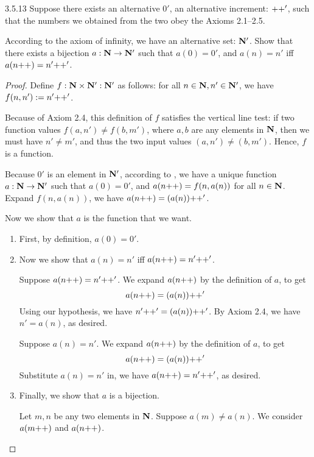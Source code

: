 \begin{exercise}{3.5.13}
	Suppose there exists an alternative $0'$, an alternative increment: ${+}{+}'$, such that the numbers we obtained from the two obey the Axioms 2.1--2.5.
	
	According to the axiom of infinity, we have an alternative set: $\mathbf{N}'$. Show that there exists a bijection $a: \mathbf{N} \to \mathbf{N}'$ such that $a(0) = 0'$, and $a(n) = n'$ iff $a(n{+}{+}) = n'{+}{+}'$.
\end{exercise}
\begin{proof}
Define $f: \mathbf{N} \times \mathbf{N}' : \mathbf{N}'$ as follows: for all $n \in \mathbf{N}, n' \in \mathbf{N}'$, we have $f(n,n') := n'{+}{+}'$.

Because of Axiom 2.4, this definition of $f$ satisfies the vertical line test: if two function values $f(a,n') \ne f(b,m')$, where $a,b$ are any elements in $\mathbf{N}$, then we must have $n' \ne m'$, and thus the two input values $(a,n') \ne (b,m')$. Hence, $f$ is a function.

Because $0'$ is an element in $\mathbf{N}'$, according to , we have a unique function $a: \mathbf{N} \to \mathbf{N}'$ such that $a(0) = 0'$, and $a(n{+}{+}) = f(n,a(n))$ for all $n \in \mathbf{N}$. Expand $f(n,a(n))$, we have $a(n{+}{+}) = (a(n)){+}{+}'$.

Now we show that $a$ is the function that we want. 
\begin{enumerate}
	\item First, by definition, $a(0) = 0'$. 
	
	\item Now we show that $a(n) = n'$ iff $a(n{+}{+}) = n'{+}{+}'$. 
	
	\myifbox Suppose $a(n{+}{+}) = n'{+}{+}'$. We expand $a(n{+}{+})$ by the definition of $a$, to get
	\[
	a(n{+}{+}) = (a(n)){+}{+}'
	\]
	Using our hypothesis, we have $n'{+}{+}' = (a(n)){+}{+}'$. By Axiom 2.4, we have $n' = a(n)$, as desired.
	
	\myoifbox Suppose $a(n) = n'$. We expand $a(n{+}{+})$ by the definition of $a$, to get
	\[
	a(n{+}{+}) = (a(n)){+}{+}'
	\]
	Substitute $a(n) = n'$ in, we have $a(n{+}{+}) = n'{+}{+}'$, as desired.
	
	\item Finally, we show that $a$ is a bijection.
	
	 Let $m,n$ be any two elements in $\mathbf{N}$. Suppose $a(m) \ne a(n)$. We consider $a(m{+}{+})$ and $a(n{+}{+})$. 
	

\end{enumerate}
\end{proof}
